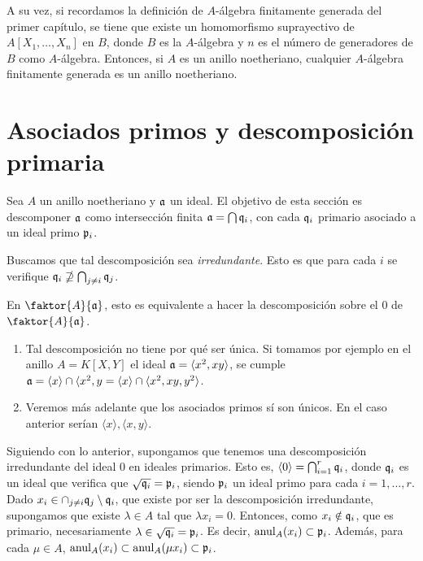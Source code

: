 \documentclass[../main.tex]{subfiles}
\begin{document}
A su vez, si recordamos la definición de $A$-álgebra finitamente generada del primer capítulo, se tiene que existe un homomorfismo suprayectivo de $A[X_1,\dots,X_n]$ en $B$, donde $B$ es la $A$-álgebra y $n$ es el número de generadores de $B$ como $A$-álgebra. Entonces, si $A$ es un anillo noetheriano, cualquier $A$-álgebra finitamente generada es un anillo noetheriano.

\section{Asociados primos y descomposición primaria}
Sea $A$ un anillo noetheriano y $\mathfrak{a}$ un ideal. El objetivo de esta sección es descomponer $\mathfrak{a}$ como intersección finita $\mathfrak{a}=\bigcap \mathfrak{q}_i$, con cada $\mathfrak{q}_i$ primario asociado a un ideal primo $\mathfrak{p}_i$.

Buscamos que tal descomposición sea \textit{irredundante}. Esto es que para cada $i$ se verifique $\mathfrak{q}_i\nsupseteq \bigcap_{j\neq i}\mathfrak{q}_j$.

En $\faktor{A}{\af}$, esto es equivalente a hacer la descomposición sobre el $0$ de $\faktor{A}{\af}$.

\begin{remark}
\begin{enumerate}
    \item Tal descomposición no tiene por qué ser única. Si tomamos por ejemplo en el anillo $A=K[X,Y]$ el ideal $\mathfrak{a}=\langle x^2,xy\rangle$, se cumple $\mathfrak{a}=\langle x\rangle\cap\langle x^2,y=\langle x\rangle\cap\langle x^2,xy,y^2\rangle$.
    \item  Veremos más adelante que los asociados primos sí son únicos. En el caso anterior serían $\langle x\rangle, \langle x,y\rangle$.
\end{enumerate}
\end{remark}
Siguiendo con lo anterior, supongamos que tenemos una descomposición irredundante del ideal $0$ en ideales primarios. Esto es, $\langle 0\rangle=\bigcap_{i=1}^r\mathfrak{q}_i$, donde $\mathfrak{q}_i$ es un ideal que verifica que $\sqrt{\mathfrak{q}_i}=\mathfrak{p}_i$, siendo $\mathfrak{p}_i$ un ideal primo para cada $i=1,\dots,r$. Dado $x_i\in\cap_{j\neq i}\mathfrak{q}_j\setminus\mathfrak{q}_i$, que existe por ser la descomposición irredundante, supongamos que existe $\lambda\in A$ tal que $\lambda x_i=0$. Entonces, como $x_i\notin\mathfrak{q}_i$, que es primario, necesariamente $\lambda\in\sqrt{\mathfrak{q}_i}=\mathfrak{p}_i$. Es decir, $\operatorname{anul}_A(x_i)\subset\mathfrak{p}_i$. Además, para cada $\mu\in A$, $\operatorname{anul}_A(x_i)\subset\operatorname{anul}_A(\mu x_i)\subset\mathfrak{p}_i$.
\end{document}
